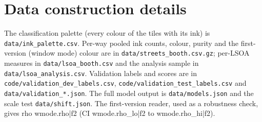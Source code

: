 \appendix
\section{Data construction details}
\label{app:data}
\sloppy
The classification palette (every colour of the tiles with its ink) is \texttt{data/ink\_palette.csv}. Per-way pooled ink counts, colour, purity and the first-version (window mode) colour are in \texttt{data/streets\_booth.csv.gz}; per-LSOA measures in \texttt{data/lsoa\_booth.csv} and the analysis sample in \texttt{data/lsoa\_analysis.csv}. Validation labels and scores are in \texttt{code/validation\_dev\_labels.csv}, \texttt{code/validation\_test\_labels.csv} and \texttt{data/validation\_*.json}. The full model output is \texttt{data/models.json} and the scale test \texttt{data/shift.json}. The first-version reader, used as a robustness check, gives rho {{wmode.rho|f2}} (CI {{wmode.rho_lo|f2}} to {{wmode.rho_hi|f2}}).
